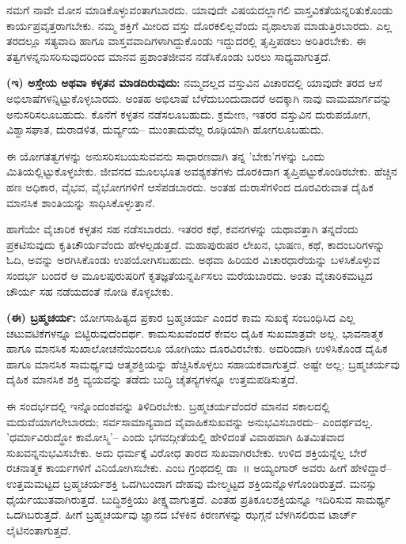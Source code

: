 ನಮಗೆ ನಾವೇ ಮೋಸ ಮಾಡಿಕೊಳ್ಳುವಂತಾಗಬಾರದು. ಯಾವುದೇ ವಿಷಯದಲ್ಲಾಗಲಿ ವಾಸ್ತವಿಕತೆಯನ್ನರಿತುಕೊಂಡು ಕಾರ್ಯಪ್ರವೃತ್ತರಾಗಬೇಕು. ನಮ್ಮ ಶಕ್ತಿಗೆ ಮೀರಿದ ವಸ್ತು ದೊರಕಲಿಲ್ಲವೆಂದು ವೃಥಾಲಾಪ ಮಾಡುತ್ತಿರಬಾರದು. ಎಲ್ಲ ತರದಲ್ಲೂ ಸತ್ಯವಾದಿ ಹಾಗೂ ವಾಸ್ತವವಾದಿಗಳಾಗಿದ್ದುಕೊಂಡು ಇದ್ದುದರಲ್ಲಿ ತೃಪ್ತಿಪಡಲು ಅರಿತಿರಬೇಕು. ಈ ತತ್ವಗಳನ್ನನುಸರಿಸುವುದರಿಂದ ಮಾನವ ಪ್ರಶಾಂತಜೀವನ ನಡೆಸಿಕೊಂಡು ಬರಲು ಸಾಧ್ಯವಾಗುತ್ತದೆ.

\textbf{(ಇ) ಅಸ್ತೇಯ ಅಥವಾ ಕಳ್ಳತನ ಮಾಡದಿರುವುದು:} ನಮ್ಮದಲ್ಲದ ವಸ್ತುವಿನ ವಿಚಾರದಲ್ಲಿ ಯಾವುದೇ ತರದ ಆಸೆ ಅಭಿಲಾಷೆಗಳನ್ನಿಟ್ಟುಕೊಳ್ಳಬಾರದು. ಅಂತಹ ಅಭಿಲಾಷೆ ಬೆಳೆದುಬಂದುದಾದರೆ ಅದಕ್ಕಾಗಿ ನಾವು ವಾಮಮಾರ್ಗವನ್ನು ಅನುಸರಿಸಲೂಬಹುದು. ಕೊನೆಗೆ ಕಳ್ಳತನ ನಡೆಸಲೂಬಹುದು. ಕ್ರಮೇಣ, ಇತರರ ವಸ್ತುವಿನ ದುರುಪಯೋಗ, ವಿಶ್ವಾಸಘಾತ, ದುರಾಡಳಿತ, ದುರ್ವ್ಯಯ– ಮುಂತಾದುವೆಲ್ಲ ರೂಢಿಯಾಗಿ ಹೋಗಲೂಬಹುದು.

ಈ ಯೋಗತತ್ವಗಳನ್ನು ಅನುಸರಿಸಬಯಸುವವನು ಸಾಧಾರಣವಾಗಿ ತನ್ನ 'ಬೇಕು'ಗಳನ್ನು ಒಂದು ಮಿತಿಯಲ್ಲಿಟ್ಟುಕೊಳ್ಳಬೇಕು. ಜೀವನದ ಮೂಲಭೂತ ಅವಶ್ಯಕತೆಗಳು ದೊರಕಿದಾಗ ತೃಪ್ತಿಪಟ್ಟುಕೊಂಡಿರಬೇಕು. ಹೆಚ್ಚಿನ ಹಣ ಅಧಿಕಾರ, ವೈಭವ, ವೈಭೋಗಗಳಿಗೆ ಆಸೆಪಡಬಾರದು. ಅಂತಹ ದುರಾಸೆಗಳಿಂದ ದೂರವಿರುವಾತ ದೈಹಿಕ ಮಾನಸಿಕ ಶಾಂತಿಯನ್ನು ಸಾಧಿಸಿಕೊಳ್ಳುತ್ತಾನೆ.

ಹಾಗೆಯೇ ವೈಚಾರಿಕ ಕಳ್ಳತನ ಸಹ ನಡೆಸಬಾರದು. ಇತರರ ಕಥೆ, ಕವನಗಳನ್ನು ಯಥಾವತ್ತಾಗಿ ತನ್ನದೆಂದು ಪ್ರಕಟಿಸುವುದು ಕೃತಿಚೌರ್ಯವೆಂದು ಹೇಳಲ್ಪಡುತ್ತದೆ. ಮಹಾಪುರುಷರ ಲೇಖನ, ಭಾಷಣ, ಕಥೆ, ಕಾದಂಬರಿಗಳನ್ನು ಓದಿ, ಅವನ್ನು ಅರಗಿಸಿಕೊಂಡು ಉಪಯೋಗಿಸಬಹುದು. ಅಥವಾ ಹಿರಿಯರ ವಿಚಾರಧಾರೆಯನ್ನು ಬಳಸಿಕೊಳ್ಳುವ ಸಂದರ್ಭ ಬಂದರೆ ಆ ಮೂಲಪುರುಷರಿಗೆ ಕೃತಜ್ಞತೆಯನ್ನರ್ಪಿಸಲು ಮರೆಯಬಾರದು. ಅಂತು ವೈಚಾರಿಕಮಟ್ಟದ ಚೌರ್ಯ ಸಹ ನಡೆಯದಂತೆ ನೋಡಿ ಕೊಳ್ಳಬೇಕು.

\textbf{(ಈ) ಬ್ರಹ್ಮಚರ್ಯ:} ಯೋಗಸಾಹಿತ್ಯದ ಪ್ರಕಾರ ಬ್ರಹ್ಮಚರ್ಯ ಎಂದರೆ ಕಾಮ ಸುಖಕ್ಕೆ ಸಂಬಂಧಿಸಿದ ಎಲ್ಲ ಚಟುವಟಿಕೆಗಳನ್ನೂ ಬಿಟ್ಟಿರುವುದೆಂದರ್ಥ. ಕಾಮಸುಖವೆಂದರೆ ಕೇವಲ ದೈಹಿಕ ಸುಖಮಾತ್ರವೇ ಅಲ್ಲ. ಭಾವನಾತ್ಮಕ ಹಾಗೂ ಮಾನಸಿಕ ಸುಖಾಲೋಚನೆಯಿಂದಲೂ ಯೋಗಿಯು ದೂರವಿರಬೇಕು. ಅದರಿಂದಾಗಿ ಉಳಿಸಿಕೊಂಡ ದೈಹಿಕ ಹಾಗೂ ಮಾನಸಿಕ ಸಾಮರ್ಥ್ಯವು ಆತ್ಮಶಕ್ತಿಯನ್ನು ಹೆಚ್ಚಿಸಿಕೊಳ್ಳಲು ಸಹಾಯಕವಾಗುತ್ತದೆ. ಅಷ್ಟೇ ಅಲ್ಲ; ಬ್ರಹ್ಮಚರ್ಯವು ದೈಹಿಕ ಮಾನಸಿಕ ಶಕ್ತಿ ವ್ಯಯವನ್ನು ತಡೆದು ಬುದ್ಧಿ ಚೈತನ್ಯಗಳನ್ನೂ ಉತ್ತಮಪಡಿಸುತ್ತದೆ.

ಈ ಸಂದರ್ಭದಲ್ಲಿ ಇನ್ನೊಂದಂಶವನ್ನು ತಿಳಿದಿರಬೇಕು. ಬ್ರಹ್ಮಚರ್ಯವೆಂದರೆ ಮಾನವ ಸಕಾಲದಲ್ಲಿ ಮದುವೆಯಾಗಲೇಬಾರದು; ಸರ್ವಸಾಮಾನ್ಯವಾದ ವೈವಾಹಿಕಸುಖವನ್ನು ಅನುಭವಿಸಬಾರದು– ಎಂದರ್ಥವಲ್ಲ. 'ಧರ್ಮಾವಿರುದ್ಧೋ ಕಾಮೋಸ್ಮಿ'– ಎಂದು ಭಗವದ್ಗೀತೆಯಲ್ಲಿ ಹೇಳಿದಂತೆ ವಿವಾಹವಾಗಿ ಹಿತಮಿತವಾದ ಸುಖವನ್ನನುಭವಿಸಬೇಕು. ಅದು ಧರ್ಮಕ್ಕೆ ವಿರೋಧ ತಾರದ ಸುಖವಾಗಿರಬೇಕು. ಉಳಿದ ಶಕ್ತಿಯನ್ನೆಲ್ಲ ಬೇರೆ ರಚನಾತ್ಮಕ ಕಾರ್ಯಗಳಿಗೆ ವಿನಿಯೋಗಿಸಬೇಕು.  ಎಂಬ ಗ್ರಂಥದಲ್ಲಿ ಡಾ~॥ ಅಯ್ಯಂಗಾರ್ ಅವರು ಹೀಗೆ ಹೇಳಿದ್ದಾರೆ–ಉತ್ತಮಮಟ್ಟದ ಬ್ರಹ್ಮಚರ್ಯಶಕ್ತಿ ಒದಗಿಬಂದಾಗ ದೇಹವು ಮೇಲ್ಮಟ್ಟದ ಶಕ್ತಿಯನ್ನೊಳಗೊಂಡಿರುತ್ತದೆ. ಮನಸ್ಸು ಧೈರ್ಯಯುತವಾಗಿರುತ್ತದೆ. ಬುದ್ಧಿಶಕ್ತಿಯು ತೀಕ್ಷ್ಣವಾಗುತ್ತದೆ. ಎಂತಹ ಪ್ರತಿಕೂಲಶಕ್ತಿಯನ್ನೂ ಇದಿರಿಸುವ ಸಾಮರ್ಥ್ಯ ಒದಗಿಬರುತ್ತದೆ. ಹೀಗೆ ಬ್ರಹ್ಮಚರ್ಯವು ಜ್ಞಾನದ ಬೆಳಕಿನ ಕಿರಣಗಳನ್ನು ಝಗ್ಗನೆ ಬೆಳಗಿಸಲಿರುವ ಟಾರ್ಚ್ ಲೈಟಿನಂತಾಗುತ್ತದೆ.

